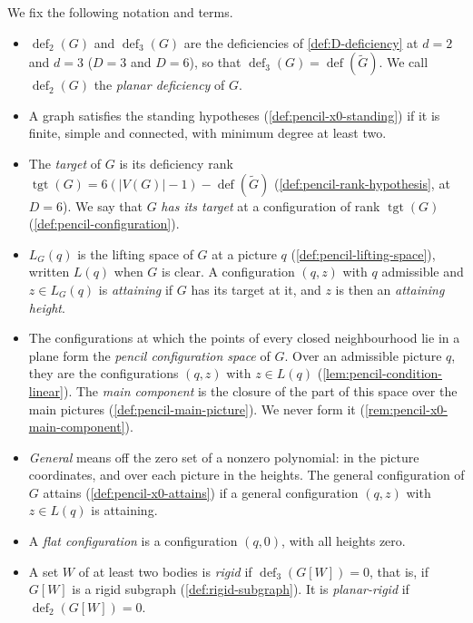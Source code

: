 We fix the following notation and terms.
\begin{itemize}
  \item $\operatorname{def}_2(G)$ and $\operatorname{def}_3(G)$ are the
    deficiencies of \cref{def:D-deficiency} at $d = 2$ and $d = 3$
    ($D = 3$ and $D = 6$), so that
    $\operatorname{def}_3(G) = \operatorname{def}(\tilde G)$. We call
    $\operatorname{def}_2(G)$ the \emph{planar deficiency} of $G$.
  \item A graph satisfies the standing hypotheses
    (\cref{def:pencil-x0-standing}) if it is finite, simple and connected,
    with minimum degree at least two.
  \item The \emph{target} of $G$ is its deficiency rank
    $\operatorname{tgt}(G) = 6(|V(G)| - 1) - \operatorname{def}(\tilde G)$
    (\cref{def:pencil-rank-hypothesis}, at $D = 6$). We say that $G$
    \emph{has its target} at a configuration of rank
    $\operatorname{tgt}(G)$ (\cref{def:pencil-configuration}).
  \item $L_G(q)$ is the lifting space of $G$ at a picture $q$
    (\cref{def:pencil-lifting-space}), written $L(q)$ when $G$ is clear. A
    configuration $(q, z)$ with $q$ admissible and $z \in L_G(q)$ is
    \emph{attaining} if $G$ has its target at it, and $z$ is then an
    \emph{attaining height}.
  \item The configurations at which the points of every closed
    neighbourhood lie in a plane form the \emph{pencil configuration
    space} of $G$. Over an admissible picture $q$, they are the
    configurations $(q, z)$ with $z \in L(q)$
    (\cref{lem:pencil-condition-linear}). The \emph{main component} is the
    closure of the part of this space over the main pictures
    (\cref{def:pencil-main-picture}). We never form it
    (\cref{rem:pencil-x0-main-component}).
  \item \emph{General} means off the zero set of a nonzero polynomial: in
    the picture coordinates, and over each picture in the heights. The
    general configuration of $G$ attains (\cref{def:pencil-x0-attains}) if
    a general configuration $(q, z)$ with $z \in L(q)$ is attaining.
  \item A \emph{flat configuration} is a configuration $(q, 0)$, with all
    heights zero.
  \item A set $W$ of at least two bodies is \emph{rigid} if
    $\operatorname{def}_3(G[W]) = 0$, that is, if $G[W]$ is a rigid
    subgraph (\cref{def:rigid-subgraph}). It is \emph{planar-rigid} if
    $\operatorname{def}_2(G[W]) = 0$.

\end{itemize}
